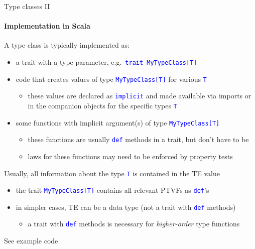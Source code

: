 \documentclass[english]{beamer}
\begin{document}
\begin{frame}{Type classes II}


\framesubtitle{Implementation in Scala}

A type class is typically implemented as:
\begin{itemize}
\item a trait with a type parameter, e.g.\ \texttt{\textcolor{blue}{\footnotesize{}trait
MyTypeClass{[}T{]}}}{\footnotesize \par}
\item code that creates values of type \texttt{\textcolor{blue}{\footnotesize{}MyTypeClass{[}T{]}}}
for various \texttt{\textcolor{blue}{\footnotesize{}T}}{\footnotesize \par}
\begin{itemize}
\item these values are declared as \texttt{\textcolor{blue}{\footnotesize{}implicit}}
and made available via imports or in the companion objects for the
specific types \texttt{\textcolor{blue}{\footnotesize{}T}}{\footnotesize \par}
\end{itemize}
\item some functions with implicit argument(s) of type \texttt{\textcolor{blue}{\footnotesize{}MyTypeClass{[}T{]}}}{\footnotesize \par}
\begin{itemize}
\item these functions are usually \texttt{\textcolor{blue}{\footnotesize{}def}}
methods in a trait, but don't have to be
\item laws for these functions may need to be enforced by property tests
\end{itemize}
\end{itemize}
Usually, all information about the type \texttt{\textcolor{blue}{\footnotesize{}T}}
is contained in the TE value
\begin{itemize}
\item the trait \texttt{\textcolor{blue}{\footnotesize{}MyTypeClass{[}T{]}}}
contains all relevant PTVFs as \texttt{\textcolor{blue}{\footnotesize{}def}}'s
\item in simpler cases, TE can be a data type (not a trait with \texttt{\textcolor{blue}{\footnotesize{}def}}
methods)
\begin{itemize}
\item a trait with \texttt{\textcolor{blue}{\footnotesize{}def}} methods
is necessary for \emph{higher-order} type functions
\end{itemize}
\end{itemize}
See example code
\end{frame}
\end{document}
